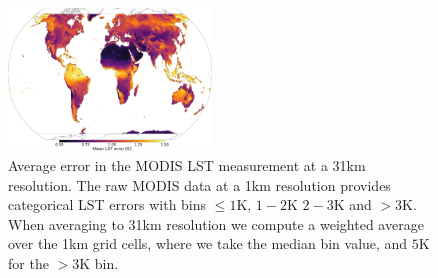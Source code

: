 \documentclass[twocolumn]{article}
\begin{document}
\begin{figure}
	\includegraphics[width=0.48\textwidth]{MODIS_obs_error}
	\caption{Average error in the MODIS LST measurement at a 31km resolution. The raw MODIS data at a 1km resolution provides categorical LST errors with bins $\leq 1$K, $1 - 2$K $2-3$K and $>3$K. When averaging to 31km resolution we compute a weighted average over the 1km grid cells, where we take the median bin value, and $5$K for the $>3$K bin.} 
	\label{fig:MODIS_obs_error}
\end{figure}
\end{document}
